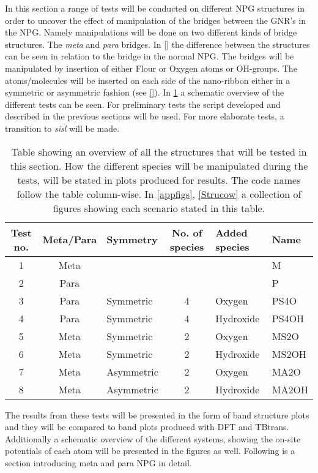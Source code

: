 In this section a range of tests will be conducted on different NPG structures in order to uncover the effect of manipulation of the bridges between the GNR's in the NPG. Namely manipulations will be done on two different kinds of bridge structures. The \textit{meta} and \textit{para} bridges. In \cref{} the difference between the structures can be seen in relation to the bridge in the normal NPG. The bridges will be manipulated by insertion of either Flour or Oxygen atoms or OH-groups. The atoms/molecules will be inserted on each side of the nano-ribbon either in a symmetric or asymmetric fashion (see \cref{}). In \cref{testtable} a schematic overview of the different tests can be seen. For preliminary tests the script developed and described in the previous sections will be used. For more elaborate tests, a transition to \textit{sisl} will be made.
\begin{table}[ht]
	\begin{tabular}{cclcll}
		\toprule
		Test no. & Meta/Para & Symmetry   & No. of species & Added species & Name  \\ \midrule
		1        & Meta      &            &                &               & M     \\
		2        & Para      &            &                &               & P     \\
		3        & Para      & Symmetric  & 4              & Oxygen        & PS4O  \\
		4        & Para      & Symmetric  & 4              & Hydroxide     & PS4OH \\
		5        & Meta      & Symmetric  & 2              & Oxygen        & MS2O  \\
		6        & Meta      & Symmetric  & 2              & Hydroxide     & MS2OH \\
		7        & Meta      & Asymmetric & 2              & Oxygen        & MA2O  \\
		8        & Meta      & Asymmetric & 2              & Hydroxide     & MA2OH \\
		\bottomrule
	\end{tabular}
	\caption{Table showing an overview of all the structures that will be tested in this section.  How the different species will be manipulated during the tests, will be stated in plots produced for results. The code names follow the table column-wise. In \cref{appfigs}, \cref{Strucow} a collection of figures showing each scenario stated in this table.}
	\label{testtable}
\end{table}
The results from these tests will be presented in the form of band structure plots and they will be compared to band plots produced with DFT and TBtrans. Additionally a schematic overview of the different systems, showing the on-site potentials of each atom will be presented in the figures as well. Following is a section introducing meta and para NPG in detail.
